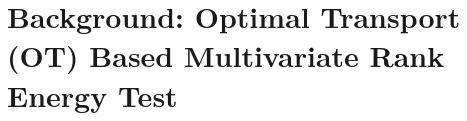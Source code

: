 \documentclass{article}
\begin{document}
\section{Background: Optimal Transport (OT) Based Multivariate Rank Energy Test}
\label{sec:background}

\end{document}
